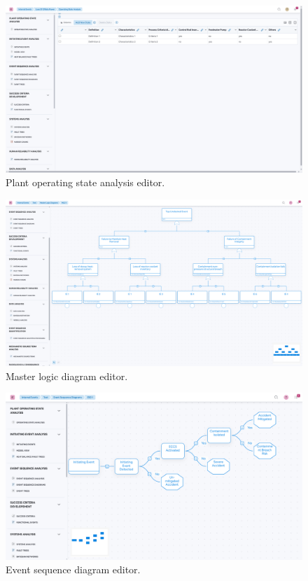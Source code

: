 \begin{figure}
  \centering
  \includegraphics[width=\textwidth]{4_proposed_solution/web_app/figures/pos.png}
  \caption{Plant operating state analysis editor.}
  \label{fig:pos_editor}
\end{figure}

\begin{figure}
  \centering
  \includegraphics[width=\textwidth]{4_proposed_solution/web_app/figures/mld.png}
  \caption{Master logic diagram editor.}
  \label{fig:mld_editor}
\end{figure}

\begin{figure}
  \centering
  \includegraphics[width=\textwidth]{4_proposed_solution/web_app/figures/esd.png}
  \caption{Event sequence diagram editor.}
  \label{fig:esd_editor}
\end{figure}

